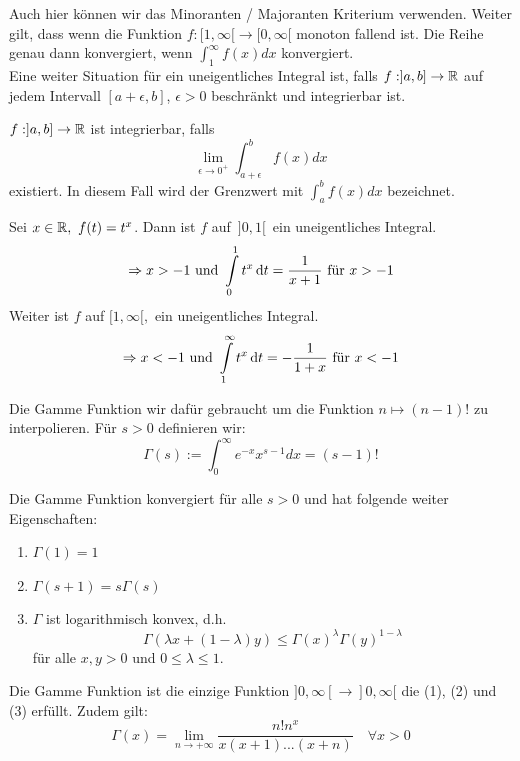 Auch hier können wir das Minoranten / Majoranten Kriterium verwenden. Weiter gilt, dass wenn die
Funktion $f : [1, \infty[ \to [0, \infty[$ monoton fallend ist. Die Reihe genau dann konvergiert,
wenn $\int_1^\infty f(x)dx$ konvergiert. \smallskip \\

Eine weiter Situation für ein uneigentliches Integral ist, falls $f : ]a,b] \to \mathbb{R}$ auf jedem
Intervall $[a + \epsilon, b]$, $\epsilon > 0$ beschränkt und integrierbar ist.

\begin{tcolorbox}
    $f : ]a,b] \to \mathbb{R}$ ist integrierbar, falls
    $$\lim_{\epsilon \to 0^+}\int_{a + \epsilon}^b f(x)dx$$
    existiert. In diesem Fall wird der Grenzwert mit $\int_a^b f(x)dx$ bezeichnet.
\end{tcolorbox}

\Bsp Sei $x \in \mathbb{R},\ f(t)=t^x$. Dann ist \(f\) auf \(\,]0,1[\,\) ein uneigentliches Integral.
$$\Rightarrow x > -1 \text{ und } \int\limits_0^1 t^x\mathop{}\!\mathrm{d} t=\frac{1}{x+1} \text{ für } x > -1$$
Weiter ist $f$ auf $[1,\infty[,$ ein uneigentliches Integral.
$$\Rightarrow x < -1 \text{ und } \int\limits_1^\infty t^x \mathop{}\!\mathrm{d} t = -\frac 1{1+x} \text{ für } x<-1$$



Die Gamme Funktion wir dafür gebraucht um die Funktion $n \mapsto (n-1)!$ zu interpolieren. Für
$s > 0$ definieren wir:
$$\Gamma(s) := \int_0^\infty e^{-x}x^{s-1}dx = (s-1)!$$

Die Gamme Funktion konvergiert für alle $s > 0$ und hat folgende weiter Eigenschaften:
\begin{enumerate}[label=(\arabic*)]
    \item $\Gamma(1) = 1$
    \item $\Gamma(s + 1) = s \Gamma(s)$
    \item $\Gamma$ ist logarithmisch konvex, d.h. 
    $$\Gamma(\lambda x + (1- \lambda)y) \leq \Gamma(x)^\lambda \Gamma(y)^{1 - \lambda}$$ 
    für alle $x,y > 0$ und $0 \leq \lambda \leq 1$.
\end{enumerate}


\columnbreak


Die Gamme Funktion ist die einzige Funktion $]0, \infty[ \to ]0, \infty[$ die (1), (2) und (3)
erfüllt. Zudem gilt:
$$\Gamma(x) = \lim_{n \to + \infty} \frac{n! n^x}{x(x+1) ... (x+n)} \quad \forall x > 0$$


